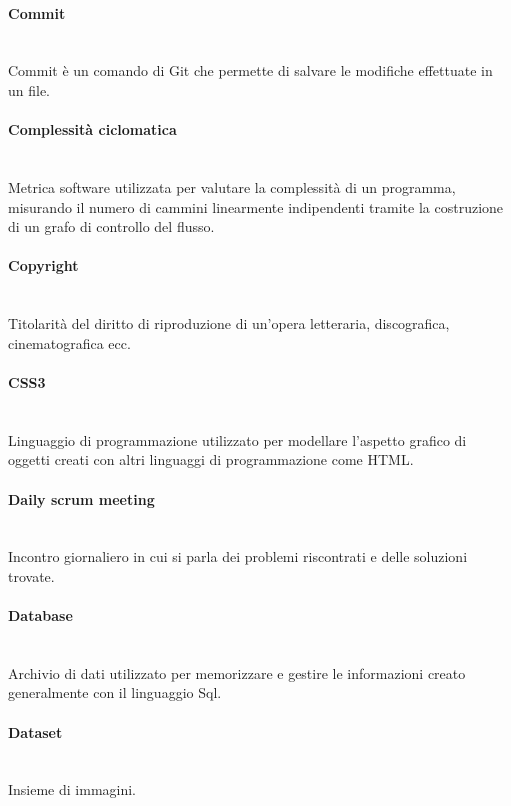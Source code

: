 \paragraph{Commit}~\smallskip \\
Commit è un comando di Git che permette di salvare le modifiche effettuate in un file.

\paragraph{Complessità ciclomatica}~\smallskip \\
Metrica software utilizzata per valutare la complessità di un programma, misurando il numero di cammini linearmente indipendenti tramite la costruzione di un grafo di controllo del flusso.

\paragraph{Copyright}~\smallskip \\
Titolarità del diritto di riproduzione di un'opera letteraria, discografica, cinematografica ecc.

\paragraph{CSS3}~\smallskip \\
Linguaggio di programmazione utilizzato per modellare l'aspetto grafico di oggetti creati con altri linguaggi di programmazione come HTML.

\paragraph{Daily scrum meeting}~\smallskip \\
Incontro giornaliero in cui si parla dei problemi riscontrati e delle soluzioni trovate.

\paragraph{Database}~\smallskip \\
Archivio di dati utilizzato per memorizzare e gestire le informazioni creato generalmente con il linguaggio Sql.

\paragraph{Dataset}~\smallskip \\
Insieme di immagini.

